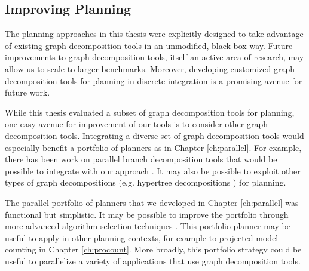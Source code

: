 
\subsection{Improving Planning}
The planning approaches in this thesis were explicitly designed to take advantage of existing graph decomposition tools in an unmodified, black-box way.
Future improvements to graph decomposition tools, itself an active area of research, may allow us to scale to larger benchmarks.
Moreover, developing customized graph decomposition tools for planning in discrete integration is a promising avenue for future work.

While this thesis evaluated a subset of graph decomposition tools for planning, one easy avenue for improvement of our tools is to consider other graph decomposition tools.
Integrating a diverse set of graph decomposition tools would especially benefit a portfolio of planners as in Chapter \ref{ch:parallel}.
For example, there has been work on parallel branch decomposition tools that would be possible to integrate with our approach \cite{hicks2000branch}.
It may also be possible to exploit other types of graph decompositions (e.g. hypertree decompositions \cite{AGG07}) for planning.

The parallel portfolio of planners that we developed in Chapter \ref{ch:parallel} was functional but simplistic.
It may be possible to improve the portfolio through more advanced algorithm-selection techniques \cite{HHLKS09,XHHL12}. 
This portfolio planner may be useful to apply in other planning contexts, for example to projected model counting in Chapter \ref{ch:procount}.
More broadly, this portfolio strategy could be useful to parallelize a variety of applications that use graph decomposition tools.


